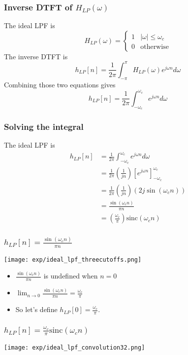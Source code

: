 \documentclass{beamer}
\begin{document}
\begin{frame}
  \frametitle{Inverse DTFT of $H_{LP}(\omega)$}

  The ideal LPF is
  \[
  H_{LP}(\omega)
  = \begin{cases} 1& |\omega|\le\omega_c\\
    0 & \mbox{otherwise}
  \end{cases}
  \]
  The inverse DTFT is
  \[
  h_{LP}[n] = \frac{1}{2\pi}\int_{-\pi}^\pi H_{LP}(\omega)e^{j\omega n}d\omega
  \]
  Combining those two equations gives
  \[
  h_{LP}[n] = \frac{1}{2\pi}\int_{-\omega_c}^{\omega_c}e^{j\omega n}d\omega
  \]
\end{frame}

\begin{frame}
  \frametitle{Solving the integral}

  The ideal LPF is
  \begin{align*}
    h_{LP}[n] &= \frac{1}{2\pi}\int_{-\omega_c}^{\omega_c}e^{j\omega n}d\omega\\
    &= \frac{1}{2\pi}\left(\frac{1}{jn}\right)\left[e^{j\omega n}\right]_{-\omega_c}^{\omega_c}\\
    &= \frac{1}{2\pi}\left(\frac{1}{jn}\right)\left(2j\sin(\omega_c n)\right)\\
    &= \frac{\sin(\omega_c n)}{\pi n}\\
    &= \left(\frac{\omega_c}{\pi}\right)\mbox{sinc}(\omega_c n)
  \end{align*}
\end{frame}

\begin{frame}
  \frametitle{$h_{LP}[n]=\frac{\sin(\omega_c n)}{\pi n}$}

  \centerline{\texttt{[image: exp/ideal\_lpf\_threecutoffs.png]}}
  \begin{itemize}
  \item $\frac{\sin(\omega_c n)}{\pi n}$ is undefined when $n=0$
  \item $\lim_{n\rightarrow 0}\frac{\sin(\omega_c n)}{\pi n}=\frac{\omega_c}{\pi}$
  \item So let's define $h_{LP}[0]=\frac{\omega_c}{\pi}$.
  \end{itemize}
\end{frame}

\begin{frame}
  \frametitle{$h_{LP}[n]=\frac{\omega_c}{\pi}\mbox{sinc}(\omega_c n)$}

  \centerline{\texttt{[image: exp/ideal\_lpf\_convolution32.png]}}
\end{frame}
\end{document}
